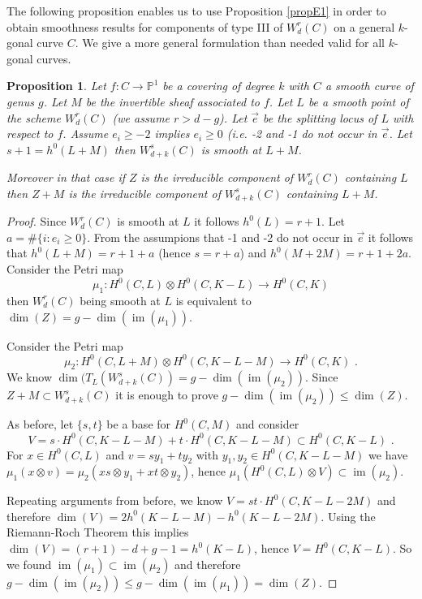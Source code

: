 \documentclass{article}
\DeclareMathOperator{\im}{im}
\newtheorem{proposition}{Proposition}
\theoremstyle{definition}
\theoremstyle{remark}
\begin{document}
The following proposition enables us to use Proposition \ref{propE1} in order to obtain smoothness results for components of type III of $W^r_d(C)$ on a general $k$-gonal curve $C$.
We give a more general formulation than needed valid for all $k$-gonal curves.

\begin{proposition}\label{prop5.2}
Let $f :C \rightarrow \mathbb{P}^1$ be a covering of degree $k$ with $C$ a smooth curve of genus $g$.
Let $M$ be the invertible sheaf associated to $f$.
Let $L$ be a smooth point of the scheme $W^r_d(C)$ (we assume $r>d-g$).
Let $\overrightarrow {e}$ be the splitting locus of $L$ with respect to $f$.
Assume $e_i \geq -2$ implies $e_i \geq 0$ (i.e. -2 and -1 do not occur in $\overrightarrow {e}$.
Let $s+1 = h^0(L+M)$ then $W^s_{d+k}(C)$ is smooth at $L+M$.

Moreover in that case if $Z$ is the irreducible component of $W^r_d(C)$ containing $L$ then $Z+M$ is the irreducible component of $W^s_{d+k}(C)$ containing $L+M$.
\end{proposition}

\begin{proof}
Since $W^r_d(C)$ is smooth at $L$ it follows $h^0(L)=r+1$.
Let $a = \# \{ i : e_i \geq 0 \}$.
From the assumpions that -1 and -2 do not occur in $\overrightarrow {e}$ it follows that $h^0(L+M)=r+1+a$ (hence $s=r+a$) and $h^0(M+2M)=r+1+2a$.
Consider the Petri map
\[
\mu_1 : H^0(C,L) \otimes H^0(C,K-L) \rightarrow H^0(C,K)
\]
then $W^r_d(C)$ being smooth at $L$ is equivalent to $\dim (Z)=g- \dim (\im (\mu_1))$.

Consider the Petri map
\[
\mu_2 : H^0(C,L+M) \otimes H^0(C,K-L-M) \rightarrow H^0(C,K)\text { .}
\]
We know $\dim (T_L(W^s_{d+k}(C))=g-\dim (\im (\mu_2))$.
Since $Z+M \subset W^s_{d+k}(C)$ it is enough to prove $g-\dim (\im (\mu_2)) \leq \dim (Z)$.

As before, let $\{ s,t \}$ be a base for $H^0(C,M)$ and consider 
\[
V=s\cdot H^0(C,K-L-M)+t\cdot H^0(C,K-L-M) \subset H^0(C,K-L) \text { .}
\]
For $x \in H^0(C,L)$ and $v=sy_1+ty_2$ with $y_1, y_2 \in H^0(C,K-L-M)$ we have $\mu_1 (x \otimes v)=\mu_2 (xs \otimes y_1 + xt \otimes y_2)$, hence $\mu_1 (H^0(C,L) \otimes V) \subset \im (\mu_2)$.

Repeating arguments from before, we know $V=st\cdot H^0(C,K-L-2M)$ and therefore $\dim (V)=2h^0(K-L-M)-h^0(K-L-2M)$.
Using the Riemann-Roch Theorem this implies $\dim (V)=(r+1)-d+g-1=h^0(K-L)$, hence $V=H^0(C,K-L)$.
So we found $\im (\mu_1) \subset \im (\mu_2)$ and therefore $g-\dim(\im (\mu_2))\leq g-\dim (\im (\mu_1))=\dim (Z)$.
\end{proof}
\end{document}

